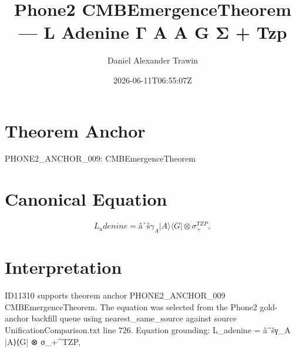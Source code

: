 \documentclass[11pt]{article}
\title{Phone2 CMBEmergenceTheorem — L Adenine Γ A A G Σ + Tzp}
\author{Daniel Alexander Trawin}
\date{2026-06-11T06:55:07Z}
\begin{document}
\maketitle
\section*{Theorem Anchor}
PHONE2_ANCHOR_009: CMBEmergenceTheorem
\section*{Canonical Equation}
\[
L_adenine = âˆšγ_A |A⟩⟨G| ⊗ σ_+^{TZP},
\]
\section*{Interpretation}
ID11310 supports theorem anchor PHONE2_ANCHOR_009 CMBEmergenceTheorem. The equation was selected from the Phone2 gold-anchor backfill queue using nearest_same_source against source UnificationComparison.txt line 726. Equation grounding: L_adenine = âˆšγ_A |A⟩⟨G| ⊗ σ_+^{TZP},
\end{document}
